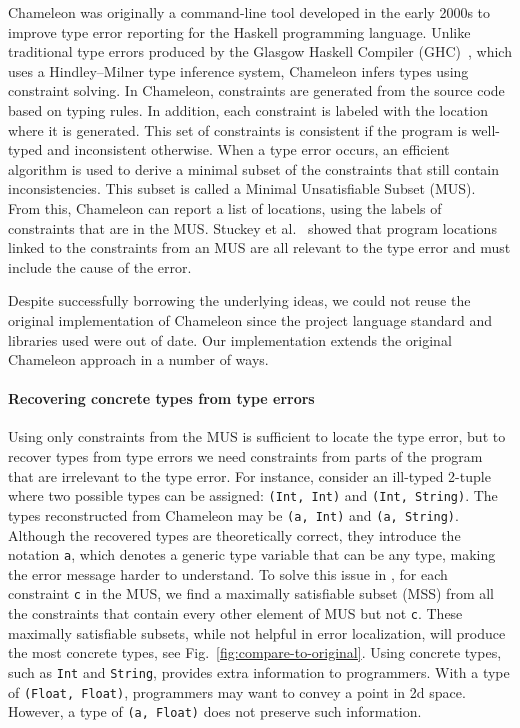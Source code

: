 Chameleon was originally a command-line tool developed in the early 2000s to improve type error reporting %
for the Haskell programming language.
Unlike traditional type errors produced by the Glasgow Haskell Compiler (GHC)~\cite{ben_gamari_home_2022}, which uses a Hindley–Milner type inference system, Chameleon infers types using constraint solving. In Chameleon, constraints are generated from the source code based on typing rules. In addition, each constraint is labeled with the location where it is generated. This set of constraints is consistent if the program is well-typed and inconsistent otherwise. When a type error occurs, an efficient algorithm is used to derive a minimal subset of the constraints that still contain inconsistencies. This subset is called a Minimal Unsatisfiable Subset (MUS). From this, Chameleon can report a list of locations, using the labels of constraints that are in the MUS. Stuckey et al.~\cite{stuckey_interactive_2003} showed that program locations linked to the constraints from an MUS are all relevant to the type error and must include the cause of the error.

Despite successfully borrowing the underlying ideas, we could not reuse the original implementation of Chameleon since the project language standard and libraries used were out of date. 
Our \chameleon{} implementation extends the original Chameleon approach in a number of ways.



\paragraph{Recovering concrete types from type errors}


Using only constraints from the MUS is sufficient to locate the type error, but to recover types from type errors we need constraints from parts of the program that are irrelevant to the type error.  For instance, consider an ill-typed 2-tuple where two possible types can be assigned: \texttt{(Int, Int)} and \texttt{(Int, String)}. The types reconstructed from Chameleon may be \texttt{(a, Int)} and \texttt{(a, String)}. Although the recovered types are theoretically correct, they introduce the notation \texttt{a}, which denotes a generic type variable that can be any type, making the error message harder to understand. To solve this issue in \chameleon{}, for each constraint \texttt{c} in the MUS, we find a maximally satisfiable subset (MSS) from all the constraints that contain every other element of MUS but not \texttt{c}. These maximally satisfiable subsets, while not helpful in error localization, will produce the most concrete types, see Fig.~\ref{fig:compare-to-original}. Using concrete types, such as \texttt{Int} and \texttt{String},  provides extra information to programmers. With a type of \texttt{(Float, Float)}, programmers may want to convey a point in 2d space. However, a type of \texttt{(a, Float)} does not preserve such information.


